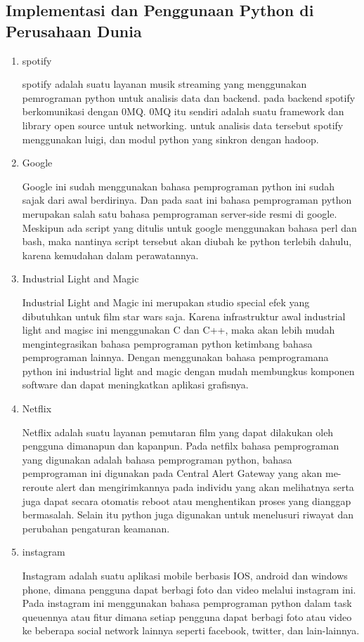 \subsection{Implementasi dan Penggunaan Python di Perusahaan Dunia}
\begin{enumerate}
\item spotify 
\par
spotify adalah suatu layanan musik streaming yang menggunakan pemrograman python untuk analisis data dan backend. pada backend spotify berkomunikasi dengan 0MQ. 0MQ itu sendiri  adalah suatu framework dan library open source untuk networking. untuk analisis data tersebut spotify menggunakan luigi, dan modul python yang sinkron dengan hadoop.
\item Google
\par 
Google ini sudah menggunakan bahasa pemprograman python ini sudah sajak dari awal berdirinya. Dan pada saat ini bahasa pemprograman python merupakan salah satu bahasa pemprograman server-side resmi di google. Meskipun ada script yang ditulis untuk google menggunakan bahasa perl dan bash, maka nantinya script tersebut akan diubah ke python terlebih dahulu, karena kemudahan dalam perawatannya.
\item Industrial Light and Magic
\par 
Industrial Light and Magic ini merupakan studio special efek yang dibutuhkan untuk film star wars saja. Karena infrastruktur awal industrial light and magisc ini menggunakan C dan C++, maka akan lebih mudah mengintegrasikan bahasa pemprograman python ketimbang bahasa pemprograman lainnya. Dengan menggunakan bahasa pemprogramana python ini industrial light and magic dengan mudah membungkus komponen software dan dapat meningkatkan aplikasi grafisnya.
\item Netflix
\par 
Netflix adalah suatu layanan pemutaran film yang dapat dilakukan oleh pengguna dimanapun dan kapanpun. Pada netfilx bahasa pemprograman yang digunakan adalah bahasa pemprograman python, bahasa pemprograman ini digunakan pada Central Alert Gateway yang akan me-reroute alert dan mengirimkannya pada individu yang akan melihatnya serta juga  dapat secara otomatis reboot atau menghentikan proses yang dianggap bermasalah. Selain itu python juga digunakan untuk menelusuri riwayat dan perubahan pengaturan keamanan.
\item instagram 
\par 
Instagram adalah suatu aplikasi mobile berbasis IOS, android dan windows phone, dimana pengguna dapat berbagi foto dan video melalui instagram ini. Pada instagram ini menggunakan bahasa pemprograman python dalam task queuennya atau fitur dimana setiap pengguna dapat berbagi foto atau video ke beberapa social network lainnya seperti facebook, twitter, dan lain-lainnya.

\end{enumerate}
